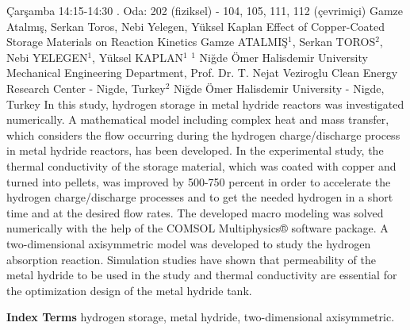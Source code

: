 
    \begin{abstract_basarim}
    {Çarşamba 14:15-14:30}
    {.}
    {Oda: 202 (fiziksel) - 104, 105, 111, 112 (çevrimiçi)}
    {Gamze Atalmış, Serkan Toros, Nebi Yelegen, Yüksel Kaplan}
    {Effect of Copper-Coated Storage Materials on Reaction Kinetics}
    {%
    Gamze ATALMIŞ$^{1}$, Serkan TOROS$^{2}$, Nebi YELEGEN$^{1}$, Yüksel KAPLAN$^{1}$}
    {%
    }
    {%
    $^1$ Niğde Ömer Halisdemir University Mechanical Engineering Department, Prof. Dr. T. Nejat Veziroglu Clean Energy Research Center - Nigde, Turkey\newline{}$^2$ Niğde Ömer Halisdemir University - Nigde, Turkey}
    In this study, hydrogen storage in metal hydride reactors was investigated numerically. A mathematical model including complex heat and mass transfer, which considers the flow occurring during the hydrogen charge/discharge process in metal hydride reactors, has been developed. In the experimental study, the thermal conductivity of the storage material, which was coated with copper and turned into pellets, was improved by 500-750 percent in order to accelerate the hydrogen charge/discharge processes and to get the needed hydrogen in a short time and at the desired flow rates. The developed macro modeling was solved numerically with the help of the COMSOL Multiphysics® software package. A two-dimensional axisymmetric model was developed to study the hydrogen absorption reaction. Simulation studies have shown that permeability of the metal hydride to be used in the study and thermal conductivity are essential for the optimization design of the metal hydride tank. 
    
            \textbf{Index Terms} \newline{}hydrogen storage, metal hydride, two-dimensional axisymmetric.
    \end{abstract_basarim}
    